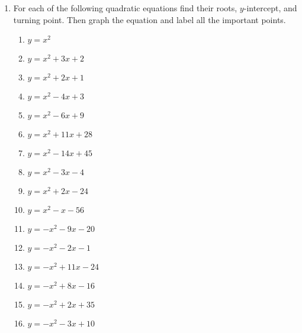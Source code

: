 \documentclass[a4paper,12pt]{article}
\begin{document}
\begin{enumerate}
\item For each of the following quadratic equations find their roots, 
$y$-intercept, and turning point. Then graph the equation and label all 
the important points.
    \begin{multicols}{2}
    \begin{enumerate}
    \item $y = x^2$
    \item $y = x^2 + 3x + 2$
    \item $y = x^2 + 2x + 1$
    \item $y = x^2 - 4x + 3$
    \item $y = x^2 - 6x + 9$
    \item $y = x^2 + 11x + 28$
    \item $y = x^2 - 14x + 45$
    \item $y = x^2 - 3x - 4$
    \item $y = x^2 + 2x - 24$
    \item $y = x^2 - x - 56$
    \item $y = -x^2 - 9x - 20$
    \item $y = -x^2 - 2x - 1$
    \item $y = -x^2 + 11x - 24$
    \item $y = -x^2 + 8x - 16$
    \item $y = -x^2 + 2x + 35$
    \item $y = -x^2 - 3x + 10$
    \end{enumerate}
    \end{multicols}
\end{enumerate}

% 
\end{document}
